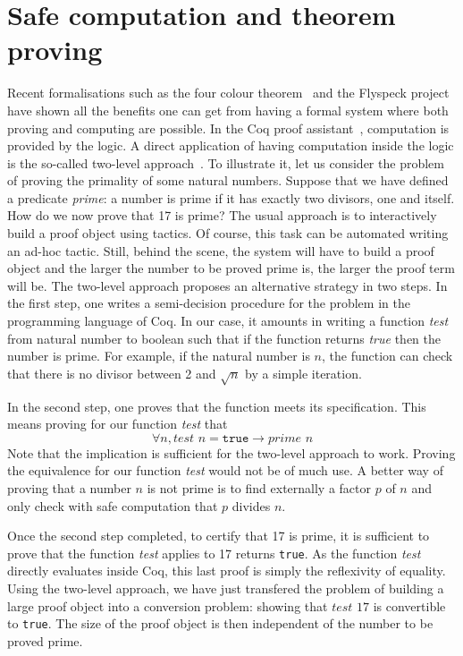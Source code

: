 

\section{Safe computation and theorem proving}

Recent formalisations such as the four colour theorem~\cite{4color} and the Flyspeck project~\cite{kepler} 
have shown all the benefits one can get from having a formal system where both proving and computing are
possible. In the {\sc Coq} proof assistant~\cite{Coq}, computation is
provided by the logic. A direct application of having computation inside the logic is 
the so-called two-level approach~\cite{boutin}. To illustrate it, 
let us consider the problem of proving the primality of some natural 
numbers.
Suppose that we have defined a predicate {\it prime}: a number is prime 
if it has exactly two divisors, one and itself. 
How do we now prove that 17 is prime? The usual approach is to
interactively build a proof object using tactics. Of course, this task can be 
automated writing an ad-hoc tactic. Still, behind the scene, the system 
will have to build a proof object and the larger the number to be proved
prime is, the larger the proof term will be.
The two-level approach proposes an alternative
strategy in two steps. In the first step, one writes a semi-decision procedure
for the problem in the programming language of {\sc Coq}. In our case, it amounts 
in writing a function {\it test} from natural number to boolean such that if the function
returns {\it true} then the number is prime. 
For example, if the natural number
is $n$, the function can check that there is no divisor between 2 and $\sqrt{n}$
by a simple iteration. 

In the second step, one proves that the function meets 
its specification. This means proving for our function {\it test} that
$$
\forall n, \textit{test}\,\, n = \texttt{true} \rightarrow \textit{prime}\,\, n
$$
Note that the implication is sufficient for the two-level approach to work.
Proving the equivalence for our function {\it test} would not be of much use.
A better way of proving that a number $n$ is not prime is to find externally a factor
$p$ of $n$ and only check with safe computation that $p$ divides $n$.

Once the second step completed, to certify that 17 is prime, it is sufficient to prove that the function
{\it test} applies to 17 returns {\tt true}. As the function {\it test} directly
evaluates inside {\sc Coq}, this last proof is simply the reflexivity of equality.
Using the two-level approach, we have just transfered the problem of building a 
large proof object into a conversion problem: showing that $\textit{test}\,\, 17$ is convertible
to {\tt true}.  The size of the proof object is then independent of the number to be proved
prime. 

